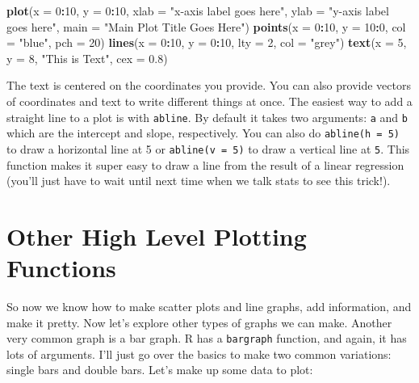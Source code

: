 \documentclass[]{book}
\newenvironment{Shaded}{\begin{snugshade}}{\end{snugshade}}
\newcommand{\KeywordTok}[1]{\textcolor[rgb]{0.13,0.29,0.53}{\textbf{#1}}}
\newcommand{\DataTypeTok}[1]{\textcolor[rgb]{0.13,0.29,0.53}{#1}}
\newcommand{\DecValTok}[1]{\textcolor[rgb]{0.00,0.00,0.81}{#1}}
\newcommand{\FloatTok}[1]{\textcolor[rgb]{0.00,0.00,0.81}{#1}}
\newcommand{\StringTok}[1]{\textcolor[rgb]{0.31,0.60,0.02}{#1}}
\newcommand{\OperatorTok}[1]{\textcolor[rgb]{0.81,0.36,0.00}{\textbf{#1}}}
\newcommand{\NormalTok}[1]{#1}
\theoremstyle{definition}
\theoremstyle{definition}
\theoremstyle{definition}
\theoremstyle{remark}
\begin{document}
\begin{Shaded}
\begin{Highlighting}[]
\KeywordTok{plot}\NormalTok{(}\DataTypeTok{x =} \DecValTok{0}\OperatorTok{:}\DecValTok{10}\NormalTok{, }\DataTypeTok{y =} \DecValTok{0}\OperatorTok{:}\DecValTok{10}\NormalTok{, }\DataTypeTok{xlab =} \StringTok{"x-axis label goes here"}\NormalTok{, }\DataTypeTok{ylab =} \StringTok{"y-axis label goes here"}\NormalTok{,}
      \DataTypeTok{main =} \StringTok{"Main Plot Title Goes Here"}\NormalTok{)}
\KeywordTok{points}\NormalTok{(}\DataTypeTok{x =} \DecValTok{0}\OperatorTok{:}\DecValTok{10}\NormalTok{, }\DataTypeTok{y =} \DecValTok{10}\OperatorTok{:}\DecValTok{0}\NormalTok{, }\DataTypeTok{col =} \StringTok{"blue"}\NormalTok{, }\DataTypeTok{pch =} \DecValTok{20}\NormalTok{)}
\KeywordTok{lines}\NormalTok{(}\DataTypeTok{x =} \DecValTok{0}\OperatorTok{:}\DecValTok{10}\NormalTok{, }\DataTypeTok{y =} \DecValTok{0}\OperatorTok{:}\DecValTok{10}\NormalTok{, }\DataTypeTok{lty =} \DecValTok{2}\NormalTok{, }\DataTypeTok{col =} \StringTok{"grey"}\NormalTok{)}
\KeywordTok{text}\NormalTok{(}\DataTypeTok{x =} \DecValTok{5}\NormalTok{, }\DataTypeTok{y =} \DecValTok{8}\NormalTok{, }\StringTok{"This is Text"}\NormalTok{, }\DataTypeTok{cex =} \FloatTok{0.8}\NormalTok{)}
\end{Highlighting}
\end{Shaded}

The text is centered on the coordinates you provide. You can also
provide vectors of coordinates and text to write different things at
once. The easiest way to add a straight line to a plot is with
\texttt{abline}. By default it takes two arguments: \texttt{a} and
\texttt{b} which are the intercept and slope, respectively. You can also
do \texttt{abline(h\ =\ 5)} to draw a horizontal line at 5 or
\texttt{abline(v\ =\ 5)} to draw a vertical line at \texttt{5}. This
function makes it super easy to draw a line from the result of a linear
regression (you'll just have to wait until next time when we talk stats
to see this trick!).

\chapter{Other High Level Plotting
Functions}\label{other-high-level-plotting-functions}

So now we know how to make scatter plots and line graphs, add
information, and make it pretty. Now let's explore other types of graphs
we can make. Another very common graph is a bar graph. R has a
\texttt{bargraph} function, and again, it has lots of arguments. I'll
just go over the basics to make two common variations: single bars and
double bars. Let's make up some data to plot:
\end{document}

